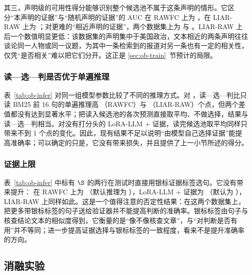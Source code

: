 其三，声明级的可用性得分能够识别整个候选池不属于这条声明的情形。它区分“本声明的证据”与“随机声明的证据”的 AUC 在 RAWFC 上为 ，在 LIAR-RAW 上为 ；对更难的“相近声明的证据”，两个数据集上为  与 。LIAR-RAW 上后一个数值明显更低：该数据集的声明集中于美国政治，文本相近的两条声明往往谈论同一人物或同一议题，为其中一条检索到的报道对另一条也有一定的相关性，仅凭“是否相关”难以把它们分开。这正是 \ref{sec:ob-train}~节预计的局限。

\subsubsection{读—选—判是否优于单遍推理}
表~\ref{tab:ob-infer} 对同一组模型参数比较了不同的推理方式。对 \ours{}，读—选—判比只读 BM25 前 16 句的单遍推理高 （RAWFC）与 （LIAR-RAW）个点，但两个差值都没有达到显著水平；把读入候选池的各次预测直接取平均、不做选择，结果与读—选—判相当。对没有打分头的 LoRA-LLM + 证据，读完候选池取平均同样只带来不到 1 个点的变化。因此，现有结果不足以说明“由模型自己选择证据”能提高准确率；可以确定的只是，它没有带来损失，并且提供了上一小节所述的得分。

\subsubsection{证据上限}
表~\ref{tab:ob-infer} 中标有 $\S$ 的两行在测试时直接用银标证据标签选句。它没有带来提升：\ours{} 在 RAWFC 上为 （默认推理为 ），LoRA-LLM + 证据为 （默认为 ），LIAR-RAW 上同样如此。这是一个值得注意的否定性结果：在这两个数据集上，把更多带银标标签的句子送给验证器并不能提高判断的准确率。银标标签由句子与核查结论文本的相似度得到，它衡量的是“像不像核查文章”，与“对判断是否有用”并不等同；进一步提高证据选择与银标标签的一致程度，看来不是提升准确率的方向。

\subsection{消融实验}\label{sec:ob-ablation}

\begin{table}[htbp]
\centering\small
\caption{\ours{} 各项设计的消融（RAWFC，macro-F1，\%）}\label{tab:ob-ablation}
\end{table}

